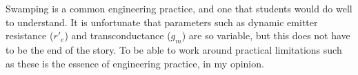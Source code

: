 





Swamping is a common engineering practice, and one that students would do well to understand.  It is unfortunate that parameters such as dynamic emitter resistance ($r'_e$) and transconductance ($g_m$) are so variable, but this does not have to be the end of the story.  To be able to work around practical limitations such as these is the essence of engineering practice, in my opinion.




